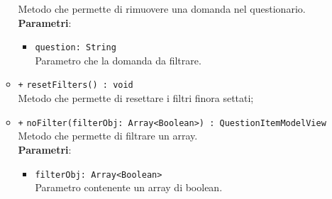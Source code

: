 \begin{itemize}
\begin{itemize}
			Metodo che permette di rimuovere una domanda nel questionario.\\
			\textbf{Parametri}:
			\begin{itemize}
				\item \texttt{question: String}\\ Parametro che la domanda da filtrare.
			\end{itemize}
			\item \texttt{+} \texttt{resetFilters() : void} \\
			Metodo che permette di resettare i filtri finora settati;\\
			\item \texttt{+} \texttt{noFilter(filterObj: Array<Boolean>) : QuestionItemModelView} \\
			Metodo che permette di filtrare un array.\\
			\textbf{Parametri}:
			\begin{itemize}
				\item \texttt{filterObj: Array<Boolean>}\\ Parametro contenente un array di boolean.
			\end{itemize}
		\end{itemize}
	\end{itemize}
	
	